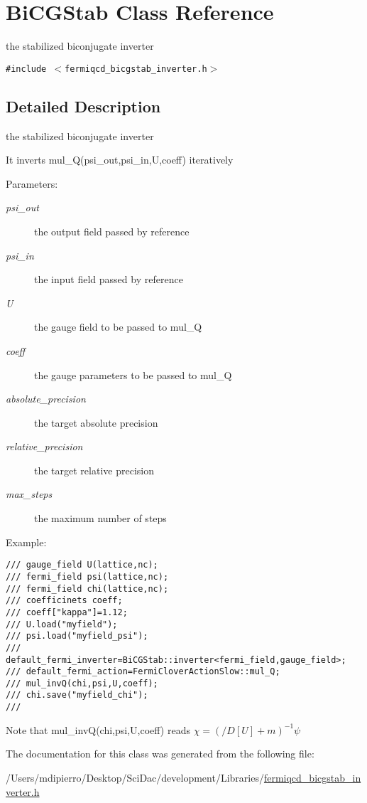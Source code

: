 \hypertarget{class_bi_c_g_stab}{
\section{BiCGStab Class Reference}
\label{class_bi_c_g_stab}
}
the stabilized biconjugate inverter  


{\tt \#include $<$fermiqcd\_\-bicgstab\_\-inverter.h$>$}



\subsection{Detailed Description}
the stabilized biconjugate inverter 

It inverts mul\_\-Q(psi\_\-out,psi\_\-in,U,coeff) iteratively \begin{Desc}
\item[Parameters:]
\begin{description}
\item[{\em psi\_\-out}]the output field passed by reference \item[{\em psi\_\-in}]the input field passed by reference \item[{\em U}]the gauge field to be passed to mul\_\-Q \item[{\em coeff}]the gauge parameters to be passed to mul\_\-Q \item[{\em absolute\_\-precision}]the target absolute precision \item[{\em relative\_\-precision}]the target relative precision \item[{\em max\_\-steps}]the maximum number of steps\end{description}
\end{Desc}
Example: 

\footnotesize\begin{verbatim}
/// gauge_field U(lattice,nc);
/// fermi_field psi(lattice,nc);
/// fermi_field chi(lattice,nc);
/// coefficinets coeff;
/// coeff["kappa"]=1.12;
/// U.load("myfield");
/// psi.load("myfield_psi");
/// default_fermi_inverter=BiCGStab::inverter<fermi_field,gauge_field>;
/// default_fermi_action=FermiCloverActionSlow::mul_Q;
/// mul_invQ(chi,psi,U,coeff);
/// chi.save("myfield_chi");
/// \end{verbatim}
\normalsize
 Note that mul\_\-invQ(chi,psi,U,coeff) reads $ \chi=(/\!\!\!D[U]+m)^{-1}\psi $ 

The documentation for this class was generated from the following file:\begin{CompactItemize}
\item 
/Users/mdipierro/Desktop/SciDac/development/Libraries/\hyperlink{fermiqcd__bicgstab__inverter_8h}{fermiqcd\_\-bicgstab\_\-inverter.h}\end{CompactItemize}
